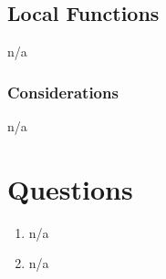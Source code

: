 \documentclass[12pt]{article}
\begin{document}
\subsection*{Local Functions}
n/a


\subsubsection* {Considerations}
n/a



\newpage
\section* {Questions}
\begin{enumerate}
    \item n/a
    \item n/a
\end{enumerate}
\end{document}
